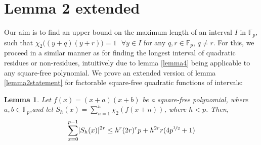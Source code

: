 \documentclass{report}
\newtheorem{lemma}{Lemma}
\begin{document}
\section{Lemma 2 extended}
%
Our aim is to find an upper bound on the maximum length of an interval $I$ in $\mathbb{F}_p$, such that $\chi_2\big((y+q)(y+r)\big)=1 \text{ }\forall y\in I$ for any $q,r\in \mathbb{F}_p$, $q\neq r$. For this, we proceed in a similar manner as for finding the longest interval of quadratic residues or non-residues, intuitively due to lemma \ref{lemma4} being applicable to any square-free polynomial. We prove an extended version of lemma \ref{lemma2statement} for factorable square-free quadratic functions of intervals:
%
\begin{lemma} \label{lemma5statement}
Let $f(x)=(x+a)(x+b)$ be a square-free polynomial, where $a,b\in \mathbb{F}_p$,and let $S_h(x)=\sum\limits_{n=1}^{h} \chi_2(f(x+n))$, where $h<p$. Then,
\begin{equation} \label{lemma5}
\sum\limits_{x=0}^{p-1}\lvert S_h(x)\rvert ^{2r}\leq h^{r}(2r)^{r}p+h^{2r}r(4p^{\nicefrac{1}{2}}+1)
\end{equation}
\end{lemma}
\end{document}
